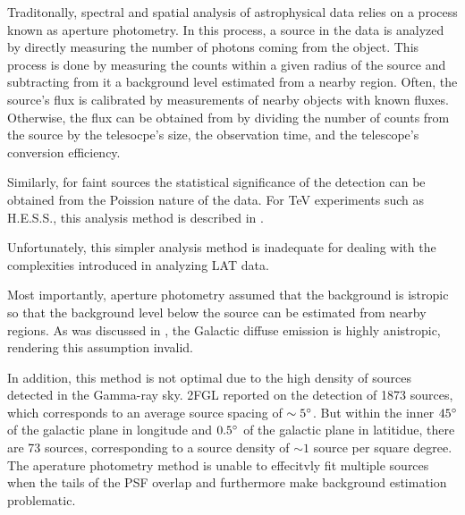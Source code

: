 
Traditonally, spectral and spatial analysis of astrophysical data
relies on a process known as aperture photometry.  In this process,
a source in the data is analyzed by directly measuring the number of
photons coming from the object. This process is done by measuring the
counts within a given radius of the source and subtracting from it a
background level estimated from a nearby region.  Often, the source's
flux is calibrated by measurements of nearby objects with known fluxes.
Otherwise, the flux can be obtained from by dividing the number of
counts from the source by the telesocpe's size, the observation time,
and the telescope's conversion efficiency.

Similarly, for faint sources the statistical significance of the
detection can be obtained from the Poission nature of the data. For
TeV experiments such as H.E.S.S., this analysis method is described in
\cite{li_1983_analysis-methods}.

Unfortunately, this simpler analysis method is inadequate for dealing
with the complexities introduced in analyzing LAT data.  

Most importantly, aperture photometry assumed that the
background is istropic so that the background level below the source
can be estimated from nearby regions.
As was discussed in ,
the Galactic diffuse emission is highly anistropic,
rendering this assumption invalid.





In addition,
this method is not optimal due to the high density of sources
detected in the Gamma-ray sky.  \Ac{2FGL} reported on the detection
of 1873 sources, which corresponds to an average source spacing of
$\sim5^\circ$.  But within the inner $45^\circ$ of the galactic plane
in longitude and $0.5^\circ$ of the galactic plane in latitidue, there
are 73 sources, corresponding to a source density of $\sim 1$ source per
square degree.  The aperature photometry method is unable to effecitvly
fit multiple sources when the tails of the PSF overlap and furthermore
make background estimation problematic.

